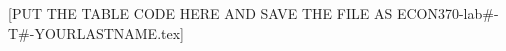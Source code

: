 \documentclass[11pt]{standalone}
\begin{document}
	
\renewcommand{\arraystretch}{1.2}
	
[PUT THE TABLE CODE HERE AND SAVE THE FILE AS ECON370-lab#-T#-YOURLASTNAME.tex] 
	
\end{document}
